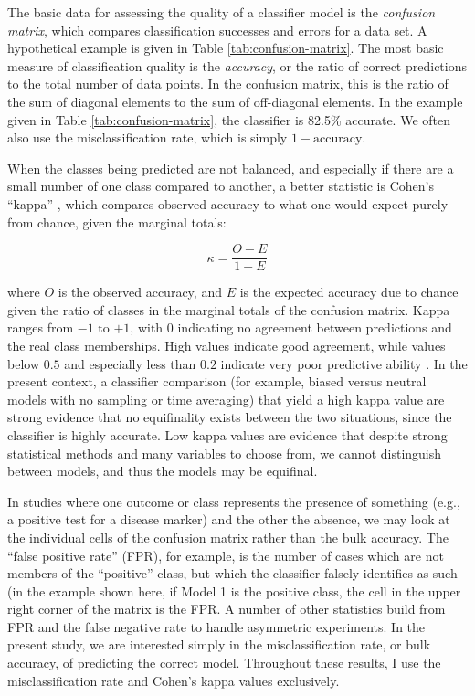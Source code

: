 \documentclass[10pt,letterpaper]{article}
\begin{document}
The basic data for assessing the quality of a classifier model is the
\emph{confusion matrix}, which compares classification successes and
errors for a data set.  A hypothetical example is given in Table
\ref{tab:confusion-matrix}.  The most basic measure of classification quality is the \emph{accuracy}, or the ratio
of correct predictions to the total number of data points.  In the confusion matrix, this is the ratio of the sum of diagonal elements to the sum of off-diagonal elements.  In the example given in Table \ref{tab:confusion-matrix}, the classifier is 82.5\% accurate. We often also use the misclassification rate, which is simply $1 - \textrm{accuracy}$.  


When the classes
being predicted are not balanced, and especially if there are a small
number of one class compared to another, a better statistic is Cohen's
``kappa'' \cite{kuhn2013applied}, which compares observed accuracy to
what one would expect purely from chance, given the marginal totals:

\begin{equation}
\kappa = \frac{O - E}{1 - E}
\label{eq:kappa}
\end{equation}

where \(O\) is the observed accuracy, and \(E\) is the expected accuracy
due to chance given the ratio of classes in the marginal totals of the
confusion matrix. Kappa ranges from \(-1\) to \(+1\), with \(0\)
indicating no agreement between predictions and the real class
memberships. High values indicate good agreement, while values below
\(0.5\) and especially less than \(0.2\) indicate very poor predictive
ability \cite{altman1991practical}. In the present context, a
classifier comparison (for example, biased versus neutral models with no
sampling or time averaging) that yield a high kappa value are strong
evidence that no equifinality exists between the two situations, since
the classifier is highly accurate. Low kappa values are evidence that
despite strong statistical methods and many variables to choose from, we
cannot distinguish between models, and thus the models may be equifinal.  

In studies where one outcome or class represents the presence of something (e.g., a positive test for a disease marker) and the other the absence, we may look at the individual cells of the confusion matrix rather than the bulk accuracy.  The ``false positive rate'' (FPR), for example, is the number of cases which are not members of the ``positive'' class, but which the classifier falsely identifies as such (in the example shown here, if Model 1 is the positive class, the cell in the upper right corner of the matrix is the FPR.  A number of other statistics build from FPR and the false negative rate to handle asymmetric experiments.  In the present study, we are interested simply in the misclassification rate, or bulk accuracy, of predicting the correct model.  Throughout these results, I use the misclassification rate and Cohen's kappa values exclusively.  
\end{document}

